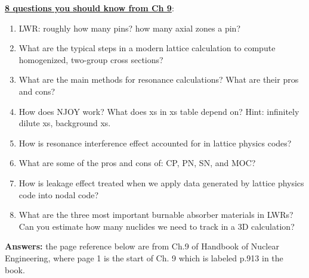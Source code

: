 \documentclass{school-22.211-notes}
\date{May 18, 2013}
\begin{document}
\maketitle


\uline{\textbf{8 questions you should know from Ch 9}}:

\begin{enumerate}
\item LWR: roughly how many pins? how many axial zones a pin?

\bigskip 
  
  \item What are the typical steps in a modern lattice calculation to
  compute homogenized, two-group cross sections? 

\bigskip 

  
\item What are the main methods for resonance calculations? What are
  their pros and cons?

\bigskip 
  
  
\item How does NJOY work? What does xs in xs table depend on?
  Hint: infinitely dilute xs, background xs.

\bigskip 

  
\item How is resonance interference effect accounted for in lattice
  physics codes?

\bigskip 

  
\item What are some of the pros and cons of: CP, PN, SN, and MOC?

\bigskip 

  
\item How is leakage effect treated when we apply data generated by
  lattice physics code into nodal code?

 \bigskip 
 
\item What are the three most important burnable absorber materials in
  LWRs? Can you estimate how many nuclides we need to track in a 3D
  calculation?
\end{enumerate}


\clearpage
\textbf{Answers:} the page reference below are from Ch.9 of Handbook
of Nuclear Engineering, where page 1 is the start of Ch. 9 which is
labeled p.913 in the book. 
\end{document}
